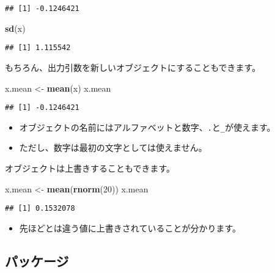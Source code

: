 \documentclass[]{bxjsarticle}
\newenvironment{Shaded}{\begin{snugshade}}{\end{snugshade}}
\newcommand{\DecValTok}[1]{\textcolor[rgb]{0.00,0.00,0.81}{#1}}
\newcommand{\KeywordTok}[1]{\textcolor[rgb]{0.13,0.29,0.53}{\textbf{#1}}}
\newcommand{\NormalTok}[1]{#1}
\newcommand{\StringTok}[1]{\textcolor[rgb]{0.31,0.60,0.02}{#1}}
\providecommand{\tightlist}{%
  \setlength{\itemsep}{0pt}\setlength{\parskip}{0pt}}
\begin{document}
\begin{verbatim}
## [1] -0.1246421
\end{verbatim}

\begin{Shaded}
\begin{Highlighting}[]
\KeywordTok{sd}\NormalTok{(x)}
\end{Highlighting}
\end{Shaded}

\begin{verbatim}
## [1] 1.115542
\end{verbatim}

もちろん、出力引数を新しいオブジェクトにすることもできます。

\begin{Shaded}
\begin{Highlighting}[]
\NormalTok{x.mean <-}\StringTok{ }\KeywordTok{mean}\NormalTok{(x)}
\NormalTok{x.mean}
\end{Highlighting}
\end{Shaded}

\begin{verbatim}
## [1] -0.1246421
\end{verbatim}

\begin{itemize}
\tightlist
\item
  オブジェクトの名前にはアルファベットと数字、\texttt{.}と\texttt{\_}が使えます。
\item
  ただし、数字は最初の文字としては使えません。
\end{itemize}

オブジェクトは上書きすることもできます。

\begin{Shaded}
\begin{Highlighting}[]
\NormalTok{x.mean <-}\StringTok{ }\KeywordTok{mean}\NormalTok{(}\KeywordTok{rnorm}\NormalTok{(}\DecValTok{20}\NormalTok{))}
\NormalTok{x.mean}
\end{Highlighting}
\end{Shaded}

\begin{verbatim}
## [1] 0.1532078
\end{verbatim}

\begin{itemize}
\tightlist
\item
  先ほどとは違う値に上書きされていることが分かります。
\end{itemize}

\hypertarget{ux30d1ux30c3ux30b1ux30fcux30b8}{%
\subsection{パッケージ}\label{ux30d1ux30c3ux30b1ux30fcux30b8}}
\end{document}
